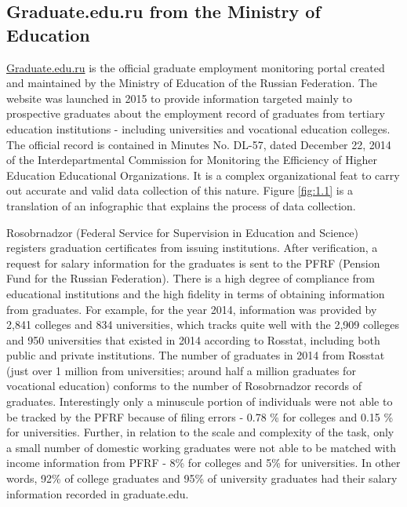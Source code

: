 \documentclass[alpha-refs]{wiley-article-05g}
\begin{document}
\subsection{Graduate.edu.ru from the Ministry of Education}

\url{Graduate.edu.ru} is the official graduate employment monitoring portal 
created and maintained by the Ministry of Education of the Russian 
Federation. The website was launched in 2015 to provide information 
targeted mainly to prospective graduates about the employment record of 
graduates from tertiary education institutions - including universities and 
vocational education colleges. The official record is contained in Minutes 
No. DL-57, dated December 22, 2014 of the Interdepartmental Commission for 
Monitoring the Efficiency of Higher Education Educational Organizations. It 
is a complex organizational feat to carry out accurate and valid data 
collection of this nature. Figure \ref{fig:1.1} is a translation of an 
infographic that explains the process of data collection. 

\vspace{0.5em}

Rosobrnadzor (Federal Service for Supervision in Education and Science) 
registers graduation certificates from issuing institutions. After 
verification, a request for salary information for the graduates is sent to 
the PFRF (Pension Fund for the Russian Federation).  There is a high degree 
of compliance from educational institutions and the high fidelity in terms 
of obtaining information from graduates. For example, for the year 2014, 
information was provided by 2,841 colleges and 834 universities, which 
tracks quite well with the 2,909 colleges and 950 universities that existed 
in 2014 according to Rosstat, including both public and private 
institutions. The number of graduates in 2014 from Rosstat (just over 1 
million from universities; around half a million graduates for vocational 
education) conforms to the number of Rosobrnadzor records of graduates. 
Interestingly only a minuscule portion of individuals were not able to be 
tracked by the PFRF because of filing errors - 0.78 \% for colleges and 
0.15 \% for universities. Further, in relation to the scale and complexity 
of the task, only a  small number of domestic working graduates were not 
able to be matched with income information from PFRF - 8\% for colleges and 
5\% for universities. In other words, 92\% of college graduates and 95\% of 
university graduates had their salary information recorded in graduate.edu. 
\end{document}
